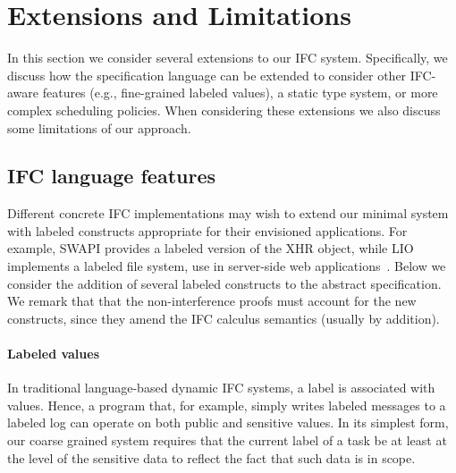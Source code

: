 \section{Extensions and Limitations}
\label{sec:extensions}

In this section we consider several extensions to our IFC system.
%
Specifically, we discuss how the specification language can be
extended to consider other IFC-aware features (e.g., fine-grained
labeled values), a static type system, or more complex scheduling
policies.
%
When considering these extensions we also discuss some limitations
of our approach.

\subsection{IFC language features}
\label{sec:extensions:labeled}

Different concrete IFC implementations may wish to extend our minimal
system with labeled constructs appropriate for their envisioned
applications.
%
For example, SWAPI provides a labeled version of the XHR object, while
LIO implements a labeled file system, use in server-side web
applications~\cite{hails}.
%
Below we
consider the addition of several labeled constructs to the abstract specification.
%
We remark that that the non-interference proofs must account for the
new constructs, since they amend the IFC calculus semantics (usually
by addition).

\paragraph{Labeled values}
In traditional language-based dynamic IFC systems, a label is
associated with values.
%
Hence, a program that, for example, simply writes labeled messages to
a labeled log can operate on both public and sensitive values.
%
In its simplest form, our coarse grained system requires that the
current label of a task be at least at the level of the sensitive data
to reflect the fact that such data is in scope.
 
